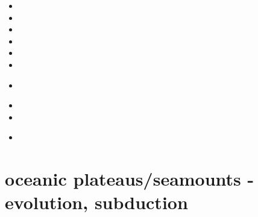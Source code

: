 \begin{small}
\begin{itemize}
\item[\nineteeneightyeight] 
\item[\nineteenninetyfour] 
\item[\nineteenninetysix] 
\item[\twothousandfour] 
\item[\twothousandseven] 
\item[\twothousandeight] 
\item[\twothousandthirteen] 
 \\
\item[\twothousandfifteen] 
\item[\twothousandseventeen] 
\item[\twothousandtwenty] 
 \\ 
\end{itemize}
\end{small}







\section{oceanic plateaus/seamounts - evolution, subduction}

